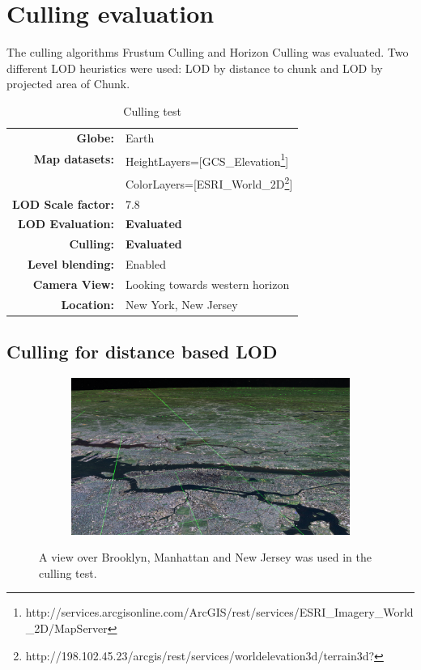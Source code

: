 \section{Culling evaluation}
The culling algorithms Frustum Culling and Horizon Culling was evaluated. Two different LOD heuristics were used: LOD by distance to chunk and LOD by projected area of Chunk.

\begin{table}
  \centering
  \caption[]{Culling test}
    \label{table:culling}
  \begin{tabular}{| r l |}
    \hline
      \textbf{Globe:}             & Earth \\
      \textbf{Map datasets:}      & HeightLayers=[GCS\_Elevation\footnote{http://services.arcgisonline.com/ArcGIS/rest/services/ESRI\_Imagery\_World\_2D/MapServer}] \\
                                  & ColorLayers=[ESRI\_World\_2D\footnote{http://198.102.45.23/arcgis/rest/services/worldelevation3d/terrain3d?}] \\
      \textbf{LOD Scale factor:}  & 7.8 \\
      \textbf{LOD Evaluation:}    & \textbf{Evaluated} \\
      \textbf{Culling:}           & \textbf{Evaluated} \\
      \textbf{Level blending:}    & Enabled \\
      \textbf{Camera View:}       & Looking towards western horizon\\
      \textbf{Location:}          & New York, New Jersey\\
    \hline
  \end{tabular}
\end{table}

\subsection{Culling for distance based LOD}

\begin{figure}[htbp]
    \centering
    \begin{subfigure}[bt]{0.9\textwidth}
        \includegraphics[width=\textwidth]{figures/results/culling/cam_d.png}
    \end{subfigure}
    \caption{A view over Brooklyn, Manhattan and New Jersey was used in the culling test.}
    \label{fig:culling}
\end{figure}

